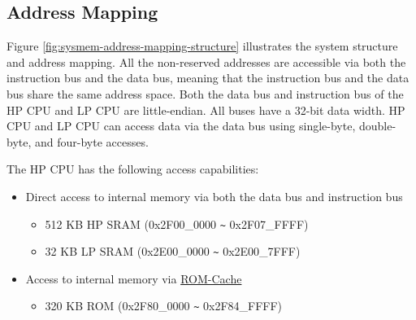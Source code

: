 \documentclass[main\_\_EN.tex]{subfiles}
\begin{document}
\subsection{Address Mapping}

Figure \ref{fig:sysmem-address-mapping-structure} illustrates the system structure and address mapping. All the non-reserved addresses are accessible via both the instruction bus and the data bus, meaning that the instruction bus and the data bus share the same address space. Both the data bus and instruction bus of the HP CPU and LP CPU are little-endian. All buses have a 32-bit data width. HP CPU and LP CPU can access data via the data bus using single-byte, double-byte, and four-byte accesses.

The HP CPU has the following access capabilities:
\begin{itemize}
\item Direct access to internal memory via both the data bus and instruction bus
  \begin{itemize}
        \item 512 KB HP SRAM (0x2F00\_0000 \verb+~+ 0x2F07\_FFFF)
        \item 32 KB LP SRAM  (0x2E00\_0000 \verb+~+ 0x2E00\_7FFF)
    \end{itemize}
\item Access to internal memory via \hyperlink{par:rom}{ROM-Cache}
    \begin{itemize}
        \item 320 KB ROM (0x2F80\_0000 \verb+~+ 0x2F84\_FFFF)
    \end{itemize}


\end{itemize}
\end{document}
